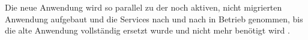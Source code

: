 Die neue Anwendung wird so parallel zu der noch aktiven, nicht migrierten Anwendung aufgebaut und die Services nach und nach in Betrieb genommen, bis die alte Anwendung vollständig ersetzt wurde und nicht mehr benötigt wird \cite[Vgl.][]{MarshBoourdon2019}\cite[Vgl.][]{Ibryam2021}\cite[Vgl.][]{Fowler2004}.
\pagebreak


